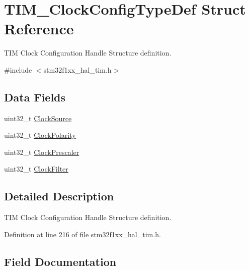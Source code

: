 \hypertarget{struct_t_i_m___clock_config_type_def}{}\section{T\+I\+M\+\_\+\+Clock\+Config\+Type\+Def Struct Reference}
\label{struct_t_i_m___clock_config_type_def}


T\+IM Clock Configuration Handle Structure definition.  




{\ttfamily \#include $<$stm32f1xx\+\_\+hal\+\_\+tim.\+h$>$}

\subsection*{Data Fields}
\begin{DoxyCompactItemize}
\item 
uint32\+\_\+t \hyperlink{struct_t_i_m___clock_config_type_def_afe27815154e535b96e8fa1b4d2fdd596}{Clock\+Source}
\item 
uint32\+\_\+t \hyperlink{struct_t_i_m___clock_config_type_def_a765acd064e3a8fb99ec74ae5109fc5ec}{Clock\+Polarity}
\item 
uint32\+\_\+t \hyperlink{struct_t_i_m___clock_config_type_def_ab791f8fac403d508e1c53b6f27cf1f24}{Clock\+Prescaler}
\item 
uint32\+\_\+t \hyperlink{struct_t_i_m___clock_config_type_def_aed791f661f8bca36911e905631bebfa5}{Clock\+Filter}
\end{DoxyCompactItemize}


\subsection{Detailed Description}
T\+IM Clock Configuration Handle Structure definition. 

Definition at line 216 of file stm32f1xx\+\_\+hal\+\_\+tim.\+h.



\subsection{Field Documentation}
\mbox{\label{struct_t_i_m___clock_config_type_def_aed791f661f8bca36911e905631bebfa5}} 
